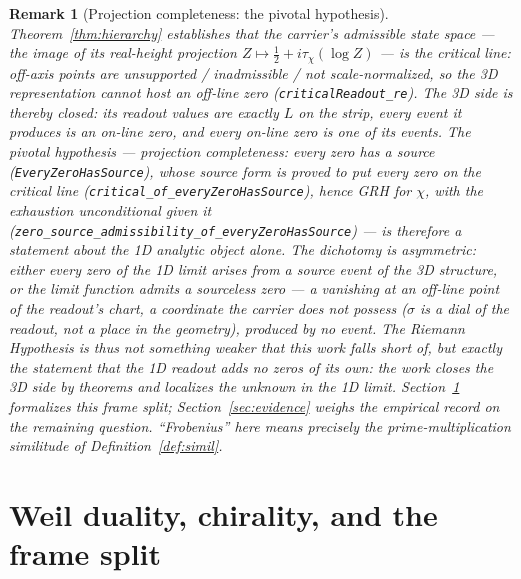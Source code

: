 \documentclass[11pt]{article}
\newtheorem{remark}[definition]{Remark}
\newcommand{\code}[1]{\texttt{#1}}
\begin{document}
\begin{remark}[Projection completeness: the pivotal hypothesis]\label{rem:admissiblescope}
Theorem~\ref{thm:hierarchy} establishes that the carrier's admissible state space --- the image of its
real-height projection $Z\mapsto\tfrac12+i\tau_\chi(\log Z)$ --- is the critical line: off-axis points are
unsupported / inadmissible / not scale-normalized, so the 3D representation \emph{cannot} host an off-line
zero (\code{criticalReadout\_re}). The 3D side is thereby closed: its readout values are exactly $L$ on
the strip, every event it produces is an on-line zero, and every on-line zero is one of its events. The
pivotal hypothesis --- \emph{projection completeness}: every zero has a source
(\code{EveryZeroHasSource}), whose source form is
proved to put every zero on the critical line (\code{critical\_of\_everyZeroHasSource}), hence GRH for
$\chi$, with the exhaustion unconditional given it
(\code{zero\_source\_admissibility\_of\_everyZeroHasSource}) --- is therefore a statement about the 1D
analytic object alone. The dichotomy is asymmetric: \emph{either} every zero of the 1D limit arises from a
source event of the 3D structure, \emph{or} the limit function admits a \emph{sourceless} zero --- a
vanishing at an off-line point of the readout's chart, a coordinate the carrier does not possess
($\sigma$ is a dial of the readout, not a place in the geometry), produced by no event. The Riemann
Hypothesis is thus not something weaker that this work falls short of, but exactly the statement that the
1D readout adds no zeros of its own: the work closes the 3D side by theorems and localizes the unknown in
the 1D limit. Section~\ref{sec:weil} formalizes this frame split;
Section~\ref{sec:evidence} weighs the empirical record on the remaining question.
``Frobenius'' here means precisely the prime-multiplication similitude of Definition~\ref{def:simil}.
\end{remark}

\section{Weil duality, chirality, and the frame split}\label{sec:weil}
\end{document}
